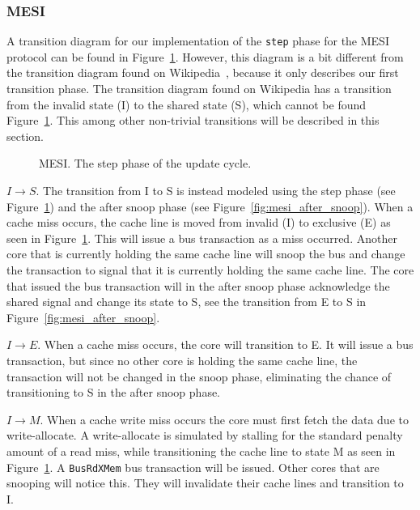 \subsubsection{MESI}

A transition diagram for our implementation of the \texttt{step} phase for the MESI protocol can be found in Figure~\ref{fig:mesi}.
However, this diagram is a bit different from the transition diagram found on
Wikipedia~\cite{mesi_wiki}, because it only describes our first transition phase.
The transition diagram found on Wikipedia has a transition from the invalid state (I) to the shared
state (S), which cannot be found Figure~\ref{fig:mesi}.
This among other non-trivial transitions will be described in this section.


\begin{figure}[ht]
    \centering
    \caption{MESI. The step phase of the update cycle.}\label{fig:mesi}
\end{figure}

$I \to S$.
The transition from I to S is instead modeled using the step phase (see Figure~\ref{fig:mesi}) and the after snoop phase (see Figure~\ref{fig:mesi_after_snoop}).
When a cache miss occurs, the cache line is moved from invalid (I) to exclusive (E) as seen in Figure~\ref{fig:mesi}.
This will issue a bus transaction as a miss occurred.
Another core that is currently holding the same cache line will snoop the bus and change the transaction to signal that it is currently holding the same cache line.
The core that issued the bus transaction will in the after snoop phase acknowledge the shared signal and change its state to S, see the transition from E to S in Figure~\ref{fig:mesi_after_snoop}.

$I \to E$.
When a cache miss occurs, the core will transition to E.
It will issue a bus transaction, but since no other core is holding the same cache line, the transaction will not be changed in the snoop phase, eliminating the chance of transitioning to S in the after snoop phase.

$I \to M$.
When a cache write miss occurs the core must first fetch the data due to write-allocate.
A write-allocate is simulated by stalling for the standard penalty amount of a read miss, while transitioning the cache line to state M as seen in Figure~\ref{fig:mesi}.
A \texttt{BusRdXMem} bus transaction will be issued.
Other cores that are snooping will notice this.
They will invalidate their cache lines and transition to I.

